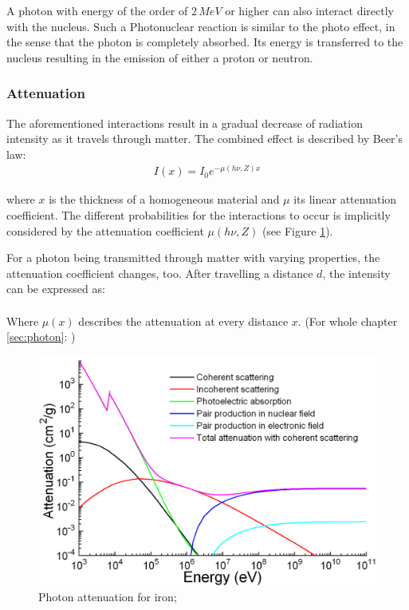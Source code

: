 A photon with energy of the order of $2 \, MeV$ or higher can also interact directly with the nucleus.
Such a Photonuclear reaction is similar to the photo effect, in the sense that the photon is completely absorbed.
Its energy is transferred to the nucleus resulting in the emission of either a proton or neutron.

\subsubsection{Attenuation}
The aforementioned interactions result in a gradual decrease of radiation intensity as it travels through matter.
The combined effect is described by Beer's law:
\begin{align}
I(x) = I_0 e^{-\mu(h\nu,Z)x}
\end{align}

where $x$ is the thickness of a homogeneous material and $\mu$ its linear attenuation coefficient.
The different probabilities for the interactions to occur is implicitly considered by the attenuation coefficient $\mu(h\nu,Z)$ (see Figure \ref{fig:attenuation_iron}).

For a photon being transmitted through matter with varying properties, the attenuation coefficient changes, too.
After travelling a distance $d$, the intensity can be expressed as:
\begin{align}
\label{eq:mu_int}
\end{align}

Where $\mu(x)$ describes the attenuation at every distance $x$.
(For whole chapter \ref{sec:photon}: \cite{Podgorsak, Maidment2014})

\begin{figure}[h!]
	\centering
	\includegraphics[width=0.7\linewidth]{../fig/intro/Ironattenuation}
	\caption{Photon attenuation for iron; \cite{Materialscientist}}
	\label{fig:attenuation_iron}
\end{figure}

